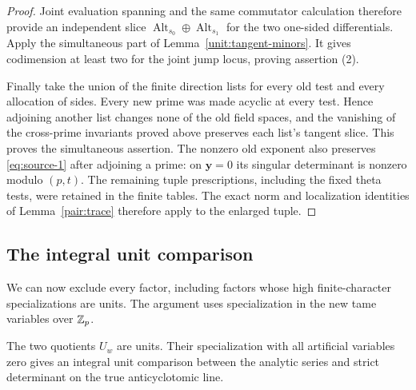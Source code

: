 \begin{proof}
Joint evaluation spanning and the same commutator calculation
therefore provide an independent slice
$\operatorname{Alt}_{s_0}\oplus\operatorname{Alt}_{s_1}$ for the
two one-sided differentials.  Apply the simultaneous part of
Lemma~\ref{unit:tangent-minors}.  It gives codimension at least two
for the joint jump locus, proving assertion (2).

Finally take the union of the finite direction lists for every
old test and every allocation of sides.  Every new prime was
made acyclic at every test.  Hence adjoining another list changes
none of the old field spaces, and the vanishing of the cross-prime
invariants proved above preserves each list's tangent slice.
This proves the simultaneous assertion.  The nonzero old exponent
also preserves \eqref{eq:source-1} after adjoining a prime: on
$\mathbf y=0$ its singular determinant is nonzero modulo $(p,t)$.
The remaining tuple prescriptions, including the fixed theta
tests, were retained in the finite tables.  The exact norm and
localization identities of Lemma~\ref{pair:trace} therefore
apply to the enlarged tuple.
\end{proof}

\subsection{The integral unit comparison}

We can now exclude every factor, including factors whose high
finite-character specializations are units.  The argument uses
specialization in the new tame variables over $\mathbb Z_p$.

\begin{theorem}\label{unit:unit-comparison}
The two quotients $U_w$ are units.  Their specialization with all
artificial variables zero gives an integral unit comparison
between the analytic series and strict determinant on the true
anticyclotomic line.
\end{theorem}

